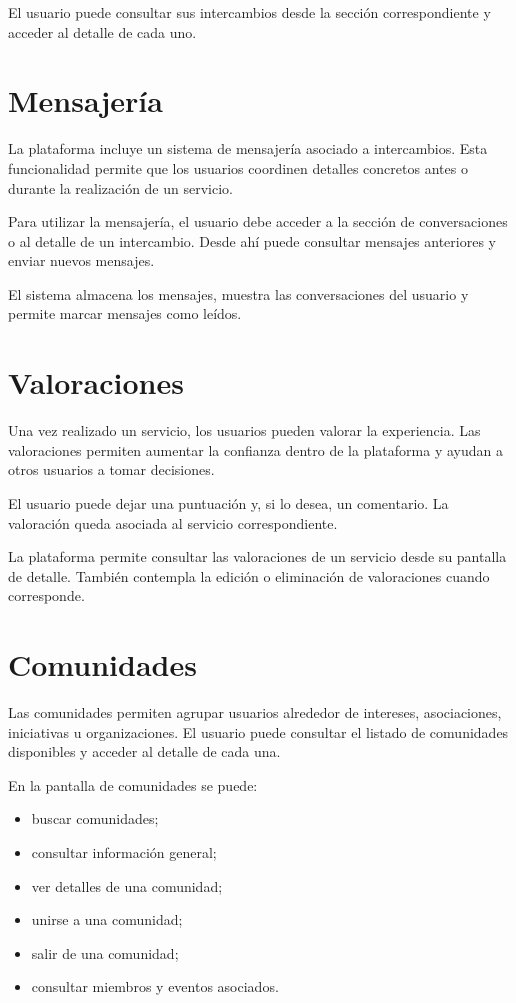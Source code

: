 El usuario puede consultar sus intercambios desde la sección correspondiente y acceder al detalle de cada uno.

\section{Mensajería}

La plataforma incluye un sistema de mensajería asociado a intercambios. Esta funcionalidad permite que los usuarios coordinen detalles concretos antes o durante la realización de un servicio.

Para utilizar la mensajería, el usuario debe acceder a la sección de conversaciones o al detalle de un intercambio. Desde ahí puede consultar mensajes anteriores y enviar nuevos mensajes.

El sistema almacena los mensajes, muestra las conversaciones del usuario y permite marcar mensajes como leídos.

\section{Valoraciones}

Una vez realizado un servicio, los usuarios pueden valorar la experiencia. Las valoraciones permiten aumentar la confianza dentro de la plataforma y ayudan a otros usuarios a tomar decisiones.

El usuario puede dejar una puntuación y, si lo desea, un comentario. La valoración queda asociada al servicio correspondiente.

La plataforma permite consultar las valoraciones de un servicio desde su pantalla de detalle. También contempla la edición o eliminación de valoraciones cuando corresponde.

\section{Comunidades}

Las comunidades permiten agrupar usuarios alrededor de intereses, asociaciones, iniciativas u organizaciones. El usuario puede consultar el listado de comunidades disponibles y acceder al detalle de cada una.

En la pantalla de comunidades se puede:

\begin{itemize}
    \item buscar comunidades;
    \item consultar información general;
    \item ver detalles de una comunidad;
    \item unirse a una comunidad;
    \item salir de una comunidad;
    \item consultar miembros y eventos asociados.
\end{itemize}

